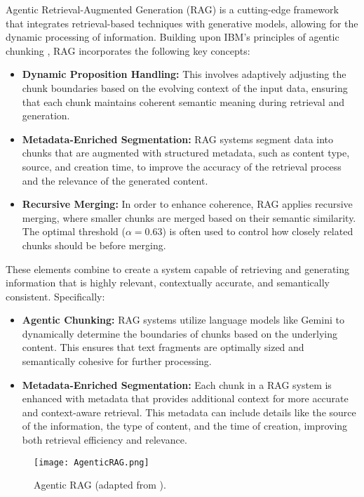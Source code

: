 \documentclass[conference]{IEEEtran}
\begin{document}
Agentic Retrieval-Augmented Generation (RAG) is a cutting-edge framework that integrates retrieval-based techniques with generative models, allowing for the dynamic processing of information. Building upon IBM’s principles of agentic chunking \cite{2}, RAG incorporates the following key concepts:

\begin{itemize}
    \item \textbf{Dynamic Proposition Handling:} This involves adaptively adjusting the chunk boundaries based on the evolving context of the input data, ensuring that each chunk maintains coherent semantic meaning during retrieval and generation.
    \item \textbf{Metadata-Enriched Segmentation:} RAG systems segment data into chunks that are augmented with structured metadata, such as content type, source, and creation time, to improve the accuracy of the retrieval process and the relevance of the generated content.
    \item \textbf{Recursive Merging:} In order to enhance coherence, RAG applies recursive merging, where smaller chunks are merged based on their semantic similarity. The optimal threshold ($\alpha=0.63$) is often used to control how closely related chunks should be before merging.
\end{itemize}

These elements combine to create a system capable of retrieving and generating information that is highly relevant, contextually accurate, and semantically consistent. Specifically:
\begin{itemize}
    \item \textbf{Agentic Chunking:} RAG systems utilize language models like Gemini to dynamically determine the boundaries of chunks based on the underlying content. This ensures that text fragments are optimally sized and semantically cohesive for further processing.
    \item \textbf{Metadata-Enriched Segmentation:} Each chunk in a RAG system is enhanced with metadata that provides additional context for more accurate and context-aware retrieval. This metadata can include details like the source of the information, the type of content, and the time of creation, improving both retrieval efficiency and relevance.
\end{itemize}

\begin{figure}[h!]
    \centering
    \texttt{[image: AgenticRAG.png]}
    \caption{Agentic RAG (adapted from \cite{16}).}
    \label{fig:RAG}
\end{figure}
\end{document}
